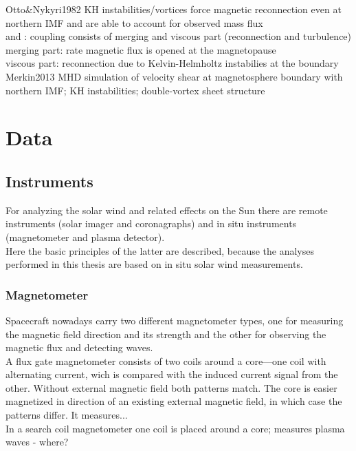 Otto\&Nykyri1982 KH instabilities/vortices force magnetic reconnection even at northern IMF and are able to account for observed mass flux\\

\citet{Newell2007} and \citet{Newell2008}: coupling consists of merging and viscous part (reconnection and turbulence)\\
merging part: rate magnetic flux is opened at the magnetopause\\
viscous part: reconnection due to Kelvin-Helmholtz instabilies at the boundary\\

Merkin2013 MHD simulation of velocity shear at magnetosphere boundary with northern IMF; KH instabilities; double-vortex sheet structure\\


\chapter{Data}
\label{chap:data}



\section{Instruments}

For analyzing the solar wind and related effects on the Sun there are remote instruments (solar imager and coronagraphs) and in situ instruments (magnetometer and plasma detector).\\
Here the basic principles of the latter are described, because the analyses performed in this thesis are based on in situ solar wind measurements.\\

\subsection{Magnetometer}

Spacecraft nowadays carry two different magnetometer types, one for measuring the magnetic field direction and its strength and the other for observing the magnetic flux and detecting waves.\\

A flux gate magnetometer consists of two coils around a core---one coil with alternating current, wich is compared with the induced current signal from the other. Without external magnetic field both patterns match. The core is easier magnetized in direction of an existing external magnetic field, in which case the patterns differ. It measures...\\
In a search coil magnetometer one coil is placed around a core; measures plasma waves - where?\\


